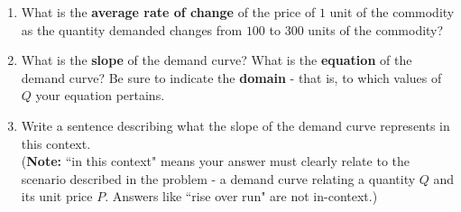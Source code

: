 \documentclass[10pt]{article}
\begin{document}
\begin{enumerate}

\item[(b)] What is the {\bf average rate of change} of the price of $1$ unit of the commodity as the quantity demanded changes from $100$ to $300$ units of the commodity?
    \vfill
\item[(c)] What is the {\bf slope} of the demand curve? What is the {\bf equation} of the demand curve? Be sure to indicate the {\bf domain} - that is, to which values of $Q$ your equation pertains.
    \vfill
    \vfill
\item[(d)] Write a sentence describing what the slope of the demand curve represents in this context.\\ 
({\bf Note:} ``in this context" means your answer must clearly relate to the scenario described in the problem - a demand curve relating a quantity $Q$ and its unit price $P$. Answers like ``rise over run" are not in-context.)
    \vfill
    \vfill
\end{enumerate}

\newpage

\,

\vspace{-0.3in}

\\

\end{document}

